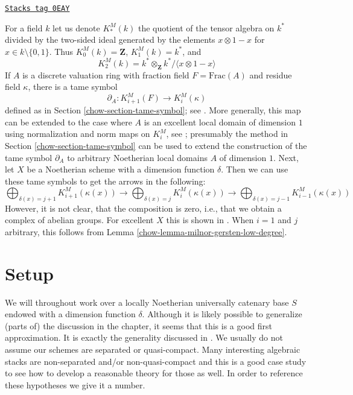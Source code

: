 \begin{remark}

\label{chow-remark-gersten-complex-milnor}
\href{https://stacks.math.columbia.edu/tag/0EAY}{\texttt{Stacks tag 0EAY}}

For a field $k$ let us denote $K^M_*(k)$ the quotient of
the tensor algebra on $k^*$ divided by the two-sided ideal
generated by the elements $x \otimes 1 - x$ for $x \in k \setminus \{0, 1\}$.
Thus $K^M_0(k) = \mathbf{Z}$, $K_1^M(k) = k^*$, and
$$
K^M_2(k) = k^* \otimes_\mathbf{Z} k^* / \langle x \otimes 1 - x \rangle
$$
If $A$ is a discrete valuation ring with fraction field $F = \text{Frac}(A)$
and residue field $\kappa$, there is a tame symbol
$$
\partial_A : K_{i + 1}^M(F) \to K_i^M(\kappa)
$$
defined as in Section \ref{chow-section-tame-symbol}; see \cite{Kato-Milnor-K}.
More generally, this map can be extended to the case where $A$ is an
excellent local domain of dimension $1$ using normalization and norm
maps on $K_i^M$, see \cite{Kato-Milnor-K}; presumably the method in
Section \ref{chow-section-tame-symbol} can be used to extend the construction
of the tame symbol $\partial_A$ to arbitrary Noetherian local domains $A$
of dimension $1$. Next, let $X$ be a Noetherian scheme with a
dimension function $\delta$. Then we can use these tame symbols to get
the arrows in the following:
$$
\bigoplus\nolimits_{\delta(x) = j + 1} K^M_{i + 1}(\kappa(x))
\longrightarrow
\bigoplus\nolimits_{\delta(x) = j} K^M_i(\kappa(x))
\longrightarrow
\bigoplus\nolimits_{\delta(x) = j - 1} K^M_{i - 1}(\kappa(x))
$$
However, it is not clear, that the composition is zero, i.e., that
we obtain a complex of abelian groups.
For excellent $X$ this is shown in \cite{Kato-Milnor-K}.
When $i = 1$ and $j$ arbitrary, this follows from
Lemma \ref{chow-lemma-milnor-gersten-low-degree}.
\end{remark}

\section{Setup}
\label{chow-section-setup}
We will throughout work over a locally Noetherian universally
catenary base $S$ endowed with a dimension function $\delta$.
Although it is likely possible to generalize (parts of) the
discussion in the chapter, it seems that this is a good first
approximation. It is exactly the generality discussed in \cite{Thorup}.
We usually do not assume our schemes are
separated or quasi-compact. Many interesting algebraic stacks
are non-separated and/or non-quasi-compact and this is a good
case study to see how to develop a reasonable theory for those as well.
In order to reference these hypotheses we give it a number.

